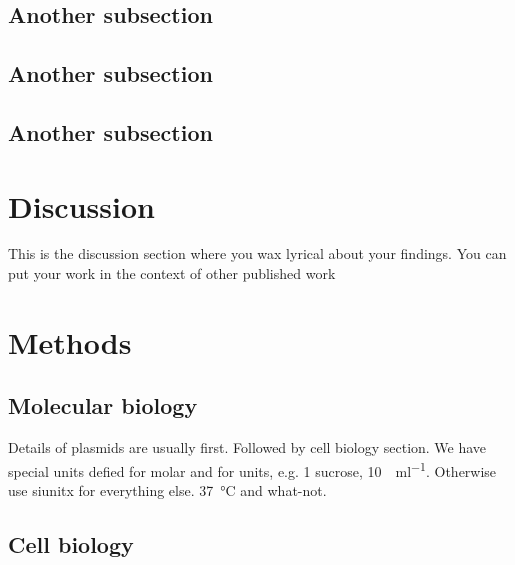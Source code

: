 \documentclass[vruler,JCS]{COB}
\begin{document}
\lipsum[12]

\subsection{Another subsection}

\lipsum[13-14]

\subsection{Another subsection}

\lipsum[13-14]

\subsection{Another subsection}

\lipsum[13-14]

\section{Discussion}\label{s:discussion}

This is the discussion section where you wax lyrical about your findings.
You can put your work in the context of other published work \citep{brenner_uga:_1967}

\lipsum[100-104]

\section{Methods}\label{s:methods}

\subsection{Molecular biology}

Details of plasmids are usually first.
Followed by cell biology section.
We have special units defied for molar and for units, e.g. \SI{1}{\Molar} sucrose, \SI{10}{\Units\per\milli\litre}.
Otherwise use siunitx for everything else. \SI{37}{\degreeCelsius} and what-not.

\subsection{Cell biology}

\lipsum[80]



\end{document}
